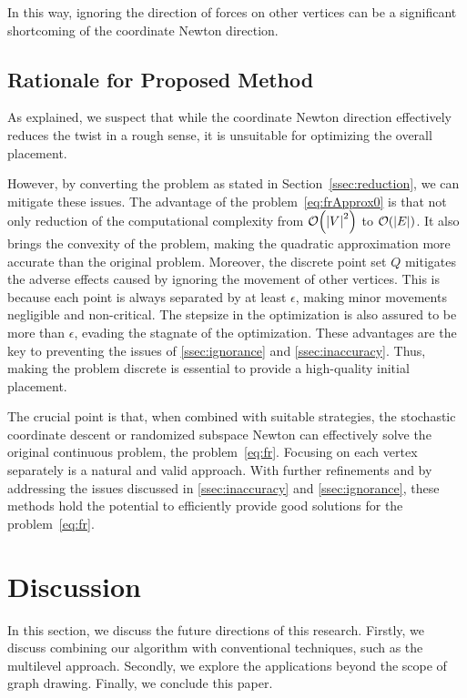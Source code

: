 \documentclass[dvipdfmx,10pt,journal,compsoc]{IEEEtran}
\begin{document}
In this way, ignoring the direction of forces on other vertices can be a significant shortcoming of the coordinate Newton direction.

\subsection{Rationale for Proposed Method}\label{ssec:rationale}

As explained, we suspect that while the coordinate Newton direction effectively reduces the twist in a rough sense, it is unsuitable for optimizing the overall placement.

However, by converting the problem as stated in Section~\ref{ssec:reduction}, we can mitigate these issues.
The advantage of the problem~\eqref{eq:frApprox0} is that not only reduction of the computational complexity from $\order{\abs{V}^2}$ to $\order{\abs{E}}$.
It also brings the convexity of the problem, making the quadratic approximation more accurate than the original problem.
Moreover, the discrete point set $Q$ mitigates the adverse effects caused by ignoring the movement of other vertices. This is because each point is always separated by at least $\epsilon$, making minor movements negligible and non-critical. The stepsize in the optimization is also assured to be more than $\epsilon$, evading the stagnate of the optimization.
These advantages are the key to preventing the issues of \cref{ssec:ignorance} and \cref{ssec:inaccuracy}.
Thus, making the problem discrete is essential to provide a high-quality initial placement.

The crucial point is that, when combined with suitable strategies, the stochastic coordinate descent or randomized subspace Newton can effectively solve the original continuous problem, the problem~\eqref{eq:fr}.
Focusing on each vertex separately is a natural and valid approach.
With further refinements and by addressing the issues discussed in \cref{ssec:inaccuracy} and \cref{ssec:ignorance}, these methods hold the potential to efficiently provide good solutions for the problem~\eqref{eq:fr}.

\section{Discussion} \label{sec:discussion}

In this section, we discuss the future directions of this research.
Firstly, we discuss combining our algorithm with conventional techniques, such as the multilevel approach.
Secondly, we explore the applications beyond the scope of graph drawing.
Finally, we conclude this paper.
\end{document}
